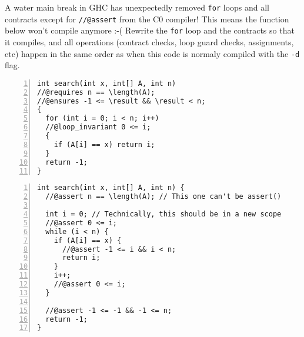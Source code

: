 
A water main break in GHC has unexpectedly removed \lstinline'for'
loops and all contracts except for \lstinline'//@assert' from the C0
compiler! This means the function below won't compile anymore :-(
Rewrite the \lstinline'for' loop and the contracts so that it
compiles, and all operations (contract checks, loop guard checks,
assignments, etc) happen in the same order as when this code is
normaly compiled with the \lstinline'-d' flag.

\smallskip

\smalllistings
\begin{lstlisting}[numbers=left]
int search(int x, int[] A, int n)
//@requires n == \length(A);
//@ensures -1 <= \result && \result < n;
{
  for (int i = 0; i < n; i++)
  //@loop_invariant 0 <= i;
  {
    if (A[i] == x) return i;
  }
  return -1;
}
\end{lstlisting}

\begin{solution}
\begin{lstlisting}[numbers=left]
int search(int x, int[] A, int n) {
  //@assert n == \length(A); // This one can't be assert()

  int i = 0; // Technically, this should be in a new scope
  //@assert 0 <= i;
  while (i < n) {
    if (A[i] == x) {
      //@assert -1 <= i && i < n;
      return i;
    }
    i++;
    //@assert 0 <= i;
  }

  //@assert -1 <= -1 && -1 <= n;
  return -1;
}
\end{lstlisting}
\end{solution}
